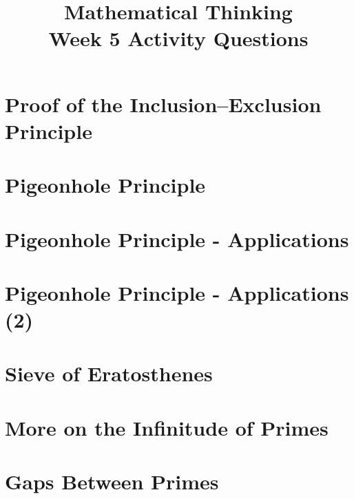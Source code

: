 \documentclass[12pt]{exam}
\title{Mathematical Thinking\\Week 5 Activity Questions}
\begin{document}
\maketitle
\tableofcontents
\section{Proof of the Inclusion–Exclusion Principle}
\begin{questions}
\end{questions}
\section{Pigeonhole Principle}
\section{Pigeonhole Principle - Applications}
\section{Pigeonhole Principle - Applications (2)}
\section{Sieve of Eratosthenes}
\section{More on the Infinitude of Primes}
\section{Gaps Between Primes}
\end{document}
